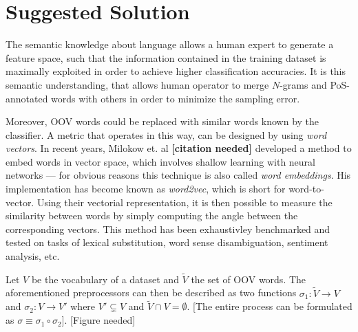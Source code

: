 \section{Suggested Solution}

The semantic knowledge about language allows a human expert to generate a
feature space, such that the information contained in the training dataset is
maximally exploited in order to achieve higher classification accuracies. It is
this semantic understanding, that allows human operator to merge $N$-grams and
PoS-annotated words with others in order to minimize the sampling error.

Moreover, OOV words could be replaced with similar words known by the
classifier.
A metric that operates in this way, can be designed by using \textit{word
vectors}. In recent years, Milokow et. al \textbf{[citation needed]} developed a method
to embed words in vector space, which involves shallow learning with neural
networks --- for obvious reasons this technique is also called \textit{word embeddings}. His
implementation has become known as \emph{word2vec}, which is short for
word-to-vector. Using their  vectorial representation, it is then possible to
measure the similarity between words by simply computing the angle between the
corresponding vectors. This method has been exhaustivley benchmarked and tested
on tasks of lexical substitution, word sense disambiguation, sentiment
analysis, etc.

Let $V$ be the vocabulary of a dataset and $\tilde{V}$ the set of OOV words. The
aforementioned preprocessors can then be described as two functions $\sigma_1:
\tilde{V} \to V$ and  $\sigma_2: V \to V'$ where $V' \subsetneq V$ and
$\tilde{V} \cap V = \emptyset$. [The entire process can be formulated as $\sigma
\equiv \sigma_1 \circ \sigma_2$]. [Figure needed]




